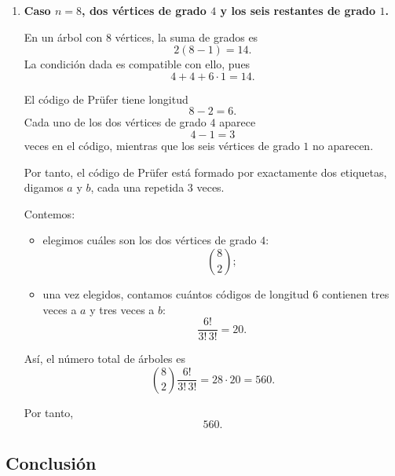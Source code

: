 \documentclass[12pt]{article}
\begin{document}
\begin{enumerate}
    Así, el código tiene la forma
    \[
    (a,a,b)
    \]
    en algún orden, con \(a\neq b\).

    Por tanto:
    \begin{itemize}
        \item elegimos el vértice de grado \(3\): \(5\) posibilidades;
        \item elegimos el vértice de grado \(2\): \(4\) posibilidades;
        \item contamos las formas de ordenar dos \(a\)'s y una \(b\):
        \[
        \frac{3!}{2!}=3.
        \]
    \end{itemize}

    Luego el número total de árboles es
    \[
    5\cdot 4\cdot 3=60.
    \]

    Por tanto,
    \[
    \boxed{60}.
    \]

    \item \textbf{Caso \(n=8\), dos vértices de grado \(4\) y los seis restantes de grado \(1\).}

    En un árbol con \(8\) vértices, la suma de grados es
    \[
    2(8-1)=14.
    \]
    La condición dada es compatible con ello, pues
    \[
    4+4+6\cdot 1=14.
    \]

    El código de Prüfer tiene longitud
    \[
    8-2=6.
    \]
    Cada uno de los dos vértices de grado \(4\) aparece
    \[
    4-1=3
    \]
    veces en el código, mientras que los seis vértices de grado \(1\) no aparecen.

    Por tanto, el código de Prüfer está formado por exactamente dos etiquetas, digamos \(a\) y \(b\), cada una repetida \(3\) veces.

    Contemos:
    \begin{itemize}
        \item elegimos cuáles son los dos vértices de grado \(4\):
        \[
        \binom{8}{2};
        \]
        \item una vez elegidos, contamos cuántos códigos de longitud \(6\) contienen tres veces a \(a\) y tres veces a \(b\):
        \[
        \frac{6!}{3!\,3!}=20.
        \]
    \end{itemize}

    Así, el número total de árboles es
    \[
    \binom{8}{2}\frac{6!}{3!\,3!}
    =28\cdot 20
    =560.
    \]

    Por tanto,
    \[
    \boxed{560}.
    \]
\end{enumerate}

\subsection*{Conclusión}
\end{document}
